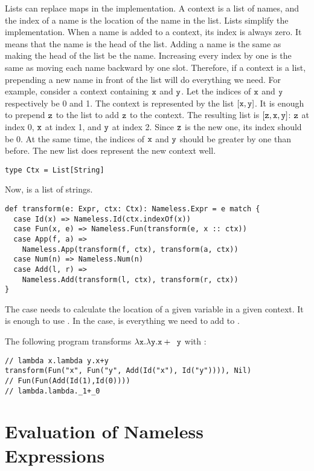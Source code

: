 Lists can replace maps in the implementation. A context is a list of names, and
the index of a name is the location of the name in the list. Lists simplify the
implementation. When a name is added to a context, its index is always zero. It
means that the name is the head of the list. Adding a name is the same as making
the head of the list be the name. Increasing every index by one is the same as
moving each name backward by one slot. Therefore, if a context is a list,
prepending a new name in front of the list will do everything we need. For
example, consider a context containing $\texttt{x}$ and $\texttt{y}$. Let the indices of
$\texttt{x}$ and $\texttt{y}$ respectively be 0 and 1. The context is represented by the
list $[\texttt{x},\texttt{y}]$. It is enough to prepend $\texttt{z}$ to the list to add
$\texttt{z}$ to the context. The resulting list is $[\texttt{z},\texttt{x},\texttt{y}]$: $\texttt{z}$ at
index 0, $\texttt{x}$ at index 1, and $\texttt{y}$ at index 2. Since $\texttt{z}$ is the new
one, its index should be 0. At the same time, the indices of $\texttt{x}$ and $\texttt{y}$
should be greater by one than before. The new list does represent the new context
well.

\begin{verbatim}
type Ctx = List[String]
\end{verbatim}

Now,  is a list of strings.

\begin{verbatim}
def transform(e: Expr, ctx: Ctx): Nameless.Expr = e match {
  case Id(x) => Nameless.Id(ctx.indexOf(x))
  case Fun(x, e) => Nameless.Fun(transform(e, x :: ctx))
  case App(f, a) =>
    Nameless.App(transform(f, ctx), transform(a, ctx))
  case Num(n) => Nameless.Num(n)
  case Add(l, r) =>
    Nameless.Add(transform(l, ctx), transform(r, ctx))
}
\end{verbatim}

The  case needs to calculate the location of a given variable in a given
context. It is enough to use . In the  case,  is everything we need to add  to .

The following program transforms $\lambda \texttt{x}.\lambda \texttt{y}.\texttt{x}+\texttt{
y}$ with :

\begin{verbatim}
// lambda x.lambda y.x+y
transform(Fun("x", Fun("y", Add(Id("x"), Id("y")))), Nil)
// Fun(Fun(Add(Id(1),Id(0))))
// lambda.lambda._1+_0
\end{verbatim}

\section{Evaluation of Nameless Expressions}

